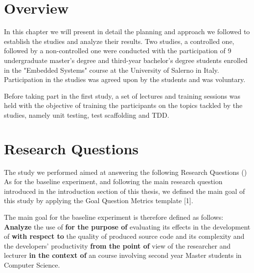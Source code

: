 \section{Overview}
In this chapter we will present in detail the planning and approach we followed to establish the studies and analyze their results. Two studies, a controlled one, followed by a non-controlled one were conducted with the participation of 9 undergraduate master's degree and third-year bachelor's degree students enrolled in the "Embedded Systems" course at the University of Salerno in Italy. Participation in the studies was agreed upon by the students and was voluntary.

Before taking part in the first study, a set of lectures and training sessions was held with the objective of training the participants on the topics tackled by the studies, namely unit testing, test scaffolding and TDD.



\section{Research Questions}
The study we performed aimed at answering the following Research Questions (\rqs)
As for the baseline experiment, and following the main research question introduced in the introduction section of this thesis, we defined the main goal of this study by applying the Goal Question Metrics template [1].



The main goal for the baseline experiment is therefore defined as follows:
\noindent
\textbf{Analyze} the use of \tdd 
\textbf{for the purpose of} evaluating its effects in the development of \ess
\textbf{with respect to} the quality of produced source code and its complexity and the developers' productivity 
\textbf{from the point of} view of the researcher and lecturer 
\textbf{in the context of} an \es course involving second year Master students in Computer Science.

